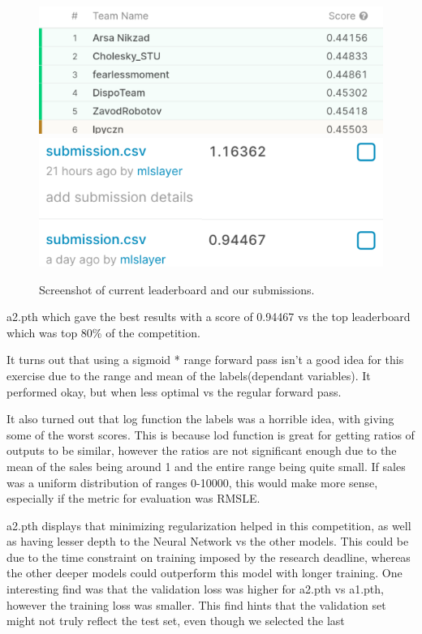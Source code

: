 \documentclass[10pt,twocolumn,letterpaper]{article}
\begin{document}
\begin{figure}[]
  \centering
  \includegraphics[width=0.7\linewidth]{img/leaderBoard.png}
  \includegraphics[width=0.7\linewidth]{img/submission.png}
  \caption{Screenshot of current leaderboard and our submissions.}
\end{figure}


  a2.pth which gave the best results with a score of 0.94467 vs the top
  leaderboard which was top 80\% of the competition.

  It turns out that using a sigmoid * range forward pass isn’t a good idea for
  this exercise due to the range and mean of the labels(dependant variables). It
  performed okay, but when less optimal vs the regular forward pass.

  It also turned out that log function the labels was a horrible idea, with giving
  some of the worst scores. This is because lod function is great for getting ratios
  of outputs to be similar, however the ratios are not significant enough due to
  the mean of the sales being around 1 and the entire range being quite small.
  If sales was a uniform distribution of ranges 0-10000, this would make more
  sense, especially if the metric for evaluation was RMSLE.

  a2.pth displays that minimizing regularization helped in this competition, as
  well as having lesser depth to the Neural Network vs the other models. This
  could be due to the time constraint on training imposed by the research
  deadline, whereas the other deeper models could outperform this model with
  longer training. One interesting find was that the validation loss was higher
  for a2.pth vs a1.pth, however the training loss was smaller. This find hints
  that the validation set might not truly reflect the test set, even though we
  selected the last
\end{document}
